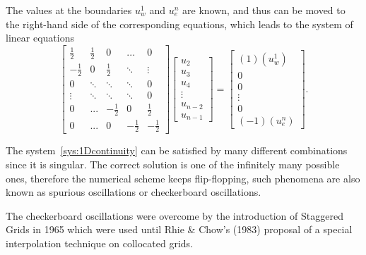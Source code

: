 \documentclass{article}
\begin{document}
The values at the boundaries $u^1_w$ and $u^n_e$ are known, and thus can be moved to the right-hand side of the corresponding equations, which leads to the system of linear equations
\begin{equation}\label{sys:1Dcontinuity}
	\begin{bmatrix}
		\frac{1}{2} & \frac{1}{2} & 0 & ... & 0 \\
		-\frac{1}{2} & 0 & \frac{1}{2} & \ddots  & \vdots  \\
		0 & \ddots  & \ddots  & \ddots  & 0 \\
		\vdots  & \ddots  & \ddots  & \ddots  & 0 \\
		0 & ... & -\frac{1}{2} & 0 & \frac{1}{2}\\
		0 & ... & 0 & -\frac{1}{2} & -\frac{1}{2}
		\end{bmatrix}\begin{bmatrix}
		u_{2} \\
		u_{3} \\
		u_{4} \\
		\vdots  \\
		u_{n-2} \\
		u_{n-1}
		\end{bmatrix}=\begin{bmatrix}
		(1)(u^1_{w}) \\
		0 \\
		0 \\
		\vdots  \\
		0 \\
		(-1)(u^n_{e})
	\end{bmatrix}.
\end{equation}


The system~\eqref{sys:1Dcontinuity} can be satisfied by many different combinations since it is singular. The correct solution is one of the infinitely many possible ones, therefore the numerical scheme keeps flip-flopping, such phenomena are also known as spurious oscillations or checkerboard oscillations.

The checkerboard oscillations were overcome by the introduction of Staggered Grids \cite{Harlow:1965} in 1965 which were used until Rhie \& Chow's (1983) \cite{Rhie:1983} proposal of a special interpolation technique on collocated grids. 
\end{document}
